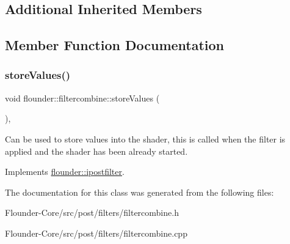 \subsection*{Additional Inherited Members}


\subsection{Member Function Documentation}
\mbox{\label{classflounder_1_1filtercombine_a0ec0634422d3ed539045d9fcfa3d119e}} 
\subsubsection{\texorpdfstring{store\+Values()}{storeValues()}}
{\footnotesize\ttfamily void flounder\+::filtercombine\+::store\+Values (\begin{DoxyParamCaption}{ }\end{DoxyParamCaption})\hspace{0.3cm}{\ttfamily [override]}, {\ttfamily [virtual]}}



Can be used to store values into the shader, this is called when the filter is applied and the shader has been already started. 



Implements \hyperlink{classflounder_1_1ipostfilter_a9b658b4672718d5ac36539875bde722e}{flounder\+::ipostfilter}.



The documentation for this class was generated from the following files\+:\begin{DoxyCompactItemize}
\item 
Flounder-\/\+Core/src/post/filters/filtercombine.\+h\item 
Flounder-\/\+Core/src/post/filters/filtercombine.\+cpp\end{DoxyCompactItemize}
